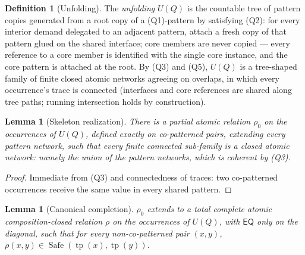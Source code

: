 \documentclass[11pt]{article}
\newtheorem{lemma}[theorem]{Lemma}
\theoremstyle{definition}
\newtheorem{definition}[theorem]{Definition}
\newcommand{\EQ}{\mathsf{EQ}}
\newcommand{\tp}{\operatorname{tp}}
\newcommand{\Safe}{\operatorname{Safe}}
\begin{document}
\begin{definition}[Unfolding]
The \emph{unfolding} $U(Q)$ is the countable tree of pattern copies
generated from a root copy of a (Q1)-pattern by satisfying (Q2): for
every interior demand delegated to an adjacent pattern, attach a fresh
copy of that pattern glued on the shared interface; core members are
never copied --- every reference to a core member is identified with
the single core instance, and the core pattern is attached at the root.
By (Q3) and (Q5), $U(Q)$ is a tree-shaped family of finite closed
atomic networks agreeing on overlaps, in which every occurrence's trace
is connected (interfaces and core references are shared along tree
paths; running intersection holds by construction).
\end{definition}

\begin{lemma}[Skeleton realization]\label{lem:skeleton}
There is a partial atomic relation $\rho_0$ on the occurrences of
$U(Q)$, defined exactly on co-patterned pairs, extending every pattern
network, such that every finite connected sub-family is a closed atomic
network: namely the union of the pattern networks, which is coherent by
(Q3).
\end{lemma}

\begin{proof}
Immediate from (Q3) and connectedness of traces: two co-patterned
occurrences receive the same value in every shared pattern.
\end{proof}

\begin{lemma}[Canonical completion]\label{lem:steer}
$\rho_0$ extends to a total complete atomic composition-closed relation
$\rho$ on the occurrences of $U(Q)$, with $\EQ$ only on the diagonal,
such that for every non-co-patterned pair $(x,y)$,
$\rho(x,y)\in\Safe(\tp(x),\tp(y))$.
\end{lemma}
\end{document}

